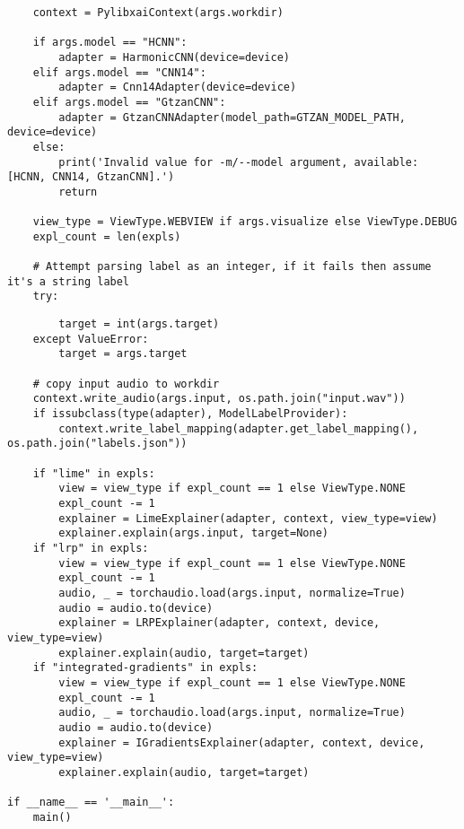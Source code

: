 \documentclass[
    bindingoffset=5mm,  %
    footnoteindent=3mm, %
    hyphenation=true    %
]{src/wut-thesis}
\begin{document}
\begin{verbatim}
    context = PylibxaiContext(args.workdir)

    if args.model == "HCNN":
        adapter = HarmonicCNN(device=device)
    elif args.model == "CNN14":
        adapter = Cnn14Adapter(device=device)
    elif args.model == "GtzanCNN":
        adapter = GtzanCNNAdapter(model_path=GTZAN_MODEL_PATH, device=device)
    else:
        print('Invalid value for -m/--model argument, available: [HCNN, CNN14, GtzanCNN].')
        return
    
    view_type = ViewType.WEBVIEW if args.visualize else ViewType.DEBUG
    expl_count = len(expls)

    # Attempt parsing label as an integer, if it fails then assume it's a string label
    try:
\end{verbatim}
\begin{verbatim}
        target = int(args.target)
    except ValueError:
        target = args.target

    # copy input audio to workdir
    context.write_audio(args.input, os.path.join("input.wav"))
    if issubclass(type(adapter), ModelLabelProvider):
        context.write_label_mapping(adapter.get_label_mapping(), os.path.join("labels.json"))
    
    if "lime" in expls:
        view = view_type if expl_count == 1 else ViewType.NONE
        expl_count -= 1
        explainer = LimeExplainer(adapter, context, view_type=view)
        explainer.explain(args.input, target=None)
    if "lrp" in expls:
        view = view_type if expl_count == 1 else ViewType.NONE
        expl_count -= 1
        audio, _ = torchaudio.load(args.input, normalize=True)
        audio = audio.to(device)
        explainer = LRPExplainer(adapter, context, device, view_type=view)
        explainer.explain(audio, target=target)
    if "integrated-gradients" in expls:
        view = view_type if expl_count == 1 else ViewType.NONE
        expl_count -= 1
        audio, _ = torchaudio.load(args.input, normalize=True)
        audio = audio.to(device)
        explainer = IGradientsExplainer(adapter, context, device, view_type=view)
        explainer.explain(audio, target=target)

if __name__ == '__main__':
    main()
\end{verbatim}

\clearpage
{} \label{appendix:TestingListing}
\end{document}

